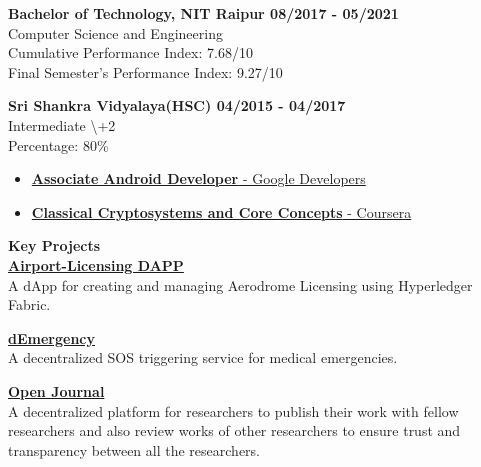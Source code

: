 \documentclass{article}
\begin{document}
\noindent \normalsize \textbf{Bachelor of Technology, NIT Raipur \hfill 08/2017 - 05/2021}\\
Computer Science and Engineering \\
Cumulative Performance Index: 7.68/10 \\
Final Semester's Performance Index: 9.27/10
\vspace{5pt}

\noindent \normalsize \textbf{Sri Shankra Vidyalaya(HSC) \hfill 04/2015 - 04/2017}\\
Intermediate \textbackslash+2 \\
Percentage: 80\% \\

\begin{itemize}[noitemsep,nolistsep,leftmargin=*]
    \item { \normalsize \href{https://www.credential.net/623b189c-719c-4845-b489-1b1618d4da79}{\textbf{Associate Android Developer} - Google Developers } }
    \item { \normalsize \href{https://www.coursera.org/account/accomplishments/certificate/X4CNCJXC335V}{\textbf{Classical Cryptosystems and Core Concepts} - Coursera} }
\end{itemize}
\vspace{5pt}
\noindent \large \textbf{\textcolor{NavyBlue}{Key Projects}} \vspace{5pt} \\
\noindent \normalsize \href{https://github.com/Shritesh99/airport}{\textbf{Airport-Licensing DAPP}} \\
\noindent \normalsize A dApp for creating and managing Aerodrome Licensing using Hyperledger Fabric.
\vspace{5pt}

\noindent \normalsize \href{https://bit.ly/31wXfMr}{\textbf{dEmergency}} \\
\noindent \normalsize A decentralized SOS triggering service for medical emergencies.
\vspace{5pt}

\noindent \normalsize \href{https://github.com/kdpisda/scientific-journal-blockchain}{\textbf{Open Journal}} \\
\noindent \normalsize A decentralized platform for researchers to publish their work with fellow researchers and also review works of other researchers to ensure trust and transparency between all the researchers.
\vspace{5pt}
\end{document}
